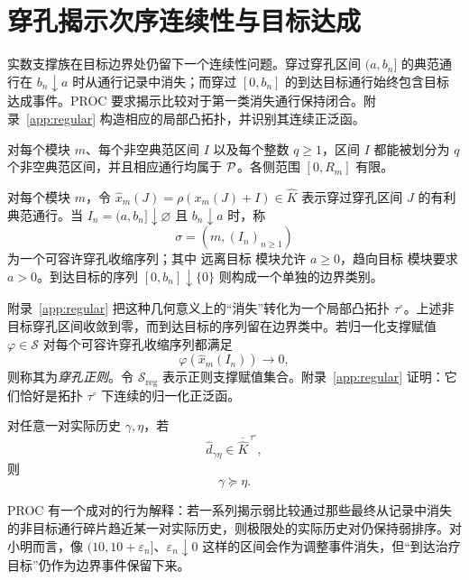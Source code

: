 \section{穿孔揭示次序连续性与目标达成}\label{sec:stieltjes}

实数支撑族在目标边界处仍留下一个连续性问题。穿过穿孔区间 $(a,b_n]$ 的典范通行在 $b_n\downarrow a$ 时从通行记录中消失；而穿过 $[0,b_n]$ 的到达目标通行始终包含目标达成事件。PROC 要求揭示比较对于第一类消失通行保持闭合。附录~\ref{app:regular} 构造相应的局部凸拓扑，并识别其连续正泛函。

\begin{assumption}[典范区间丰富性]\label{ass:richness}
对每个模块 $m$、每个非空典范区间 $I$ 以及每个整数 $q\ge1$，区间 $I$ 都能被划分为 $q$ 个非空典范区间，并且相应通行均属于 $\mathcal P$。各侧范围 $[0,R_m]$ 有限。
\end{assumption}

对每个模块 $m$，令 $\widehat x_m(J)=\rho(x_m(J)+I)\in\widehat K$ 表示穿过穿孔区间 $J$ 的有利典范通行。当 $I_n=(a,b_n]\downarrow\varnothing$ 且 $b_n\downarrow a$ 时，称
\[
 \sigma=(m,(I_n)_{n\ge1})
\]
为一个可容许穿孔收缩序列；其中 远离目标 模块允许 $a\ge0$，趋向目标 模块要求 $a>0$。到达目标的序列 $[0,b_n]\downarrow\{0\}$ 则构成一个单独的边界类别。

附录~\ref{app:regular} 把这种几何意义上的“消失”转化为一个局部凸拓扑 $\tau^\circ$。上述非目标穿孔区间收敛到零，而到达目标的序列留在边界类中。若归一化支撑赋值 $\varphi\in\mathcal S$ 对每个可容许穿孔收缩序列都满足
\[
 \varphi(\widehat x_m(I_n))\longrightarrow0,
\]
则称其为\emph{穿孔正则}。令 $\mathcal S_{\mathrm{reg}}$ 表示正则支撑赋值集合。附录~\ref{app:regular} 证明：它们恰好是拓扑 $\tau^\circ$ 下连续的归一化正泛函。

\begin{assumption}\label{def:proc}
对任意一对实际历史 $\gamma,\eta$，若
\[
 \widehat d_{\gamma\eta}\in\overline{\widehat K}^{\,\tau^\circ},
\]
则
\[
 \gamma\succeq\eta.
\]
\end{assumption}

PROC 有一个成对的行为解释：若一系列揭示弱比较通过那些最终从记录中消失的非目标通行碎片趋近某一对实际历史，则极限处的实际历史对仍保持弱排序。对小明而言，像 $(10,10+\varepsilon_n]$、$\varepsilon_n\downarrow0$ 这样的区间会作为调整事件消失，但“到达治疗目标”仍作为边界事件保留下来。

